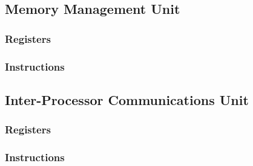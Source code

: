 \documentclass[letterpaper, 11pt]{article}
\begin{document}
\subsection{Memory Management Unit}
\subsubsection{Registers}
\subsubsection{Instructions}
\subsection{Inter-Processor Communications Unit}
\subsubsection{Registers}
\subsubsection{Instructions}
\end{document}
